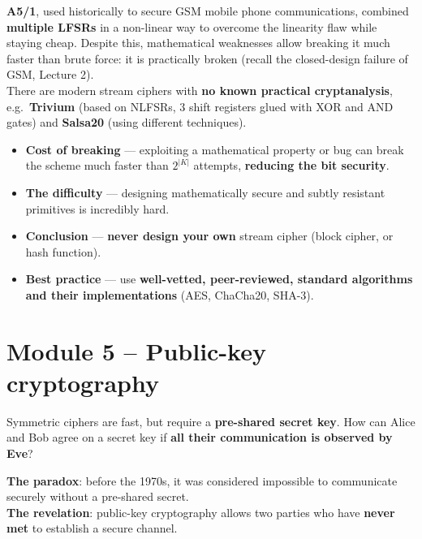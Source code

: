 \begin{exbox}[title={A5/1 and modern stream ciphers}]
\textbf{A5/1}, used historically to secure GSM mobile phone communications, combined
\textbf{multiple LFSRs} in a non-linear way to overcome the linearity flaw while staying
cheap. Despite this, mathematical weaknesses allow breaking it much faster than brute
force: it is practically broken (recall the closed-design failure of GSM, Lecture 2). \\
There are modern stream ciphers with \textbf{no known practical cryptanalysis}, e.g.\
\textbf{Trivium} (based on NLFSRs, 3 shift registers glued with XOR and AND gates) and
\textbf{Salsa20} (using different techniques).
\end{exbox}

\begin{keybox}[title=Bit security and consequences]
\begin{itemize}
  \item \textbf{Cost of breaking} --- exploiting a mathematical property or bug can break
        the scheme much faster than $2^{|K|}$ attempts, \textbf{reducing the bit
        security}.
  \item \textbf{The difficulty} --- designing mathematically secure and subtly resistant
        primitives is incredibly hard.
  \item \textbf{Conclusion} --- \textbf{never design your own} stream cipher (block
        cipher, or hash function).
  \item \textbf{Best practice} --- use \textbf{well-vetted, peer-reviewed, standard
        algorithms and their implementations} (AES, ChaCha20, SHA-3).
\end{itemize}
\end{keybox}

\section{Module 5 -- Public-key cryptography}

\begin{defnbox}[title=Key distribution problem]
Symmetric ciphers are fast, but require a \textbf{pre-shared secret key}. How can Alice
and Bob agree on a secret key if \textbf{all their communication is observed by Eve}?
\end{defnbox}

\begin{defnbox}[title=Public-key (asymmetric) cryptography]
\textbf{The paradox}: before the 1970s, it was considered impossible to communicate
securely without a pre-shared secret. \\
\textbf{The revelation}: public-key cryptography allows two parties who have
\textbf{never met} to establish a secure channel.
\end{defnbox}

